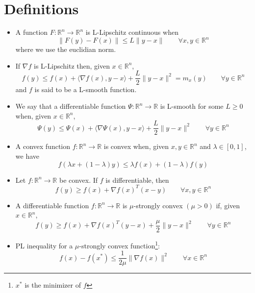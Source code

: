 \documentclass[12pt, openany]{report}
\begin{document}
\section{Definitions}
\begin{itemize}
    \item A function \(F:\mathbb{R}^n\rightarrow \mathbb{R}^n\) is L-Lipschitz continuous when \[\lVert F(y)-F(x)\rVert \le L\lVert y-x\rVert\qquad \forall x,y\in \mathbb{R}^n\]where we use the euclidian norm. 
    \item If \(\nabla f\) is L-Lipschitz then, given \(x\in \mathbb{R}^n\), \[f(y)\le f(x)+\langle \nabla f(x), y-x\rangle +\frac{L}{2}\lVert y-x\rVert^2 = m_x(y)\qquad \forall y\in \mathbb{R}^n\]and \(f\) is said to be a L-smooth function.
    \item We say that a differentiable function \(\Psi:\mathbb{R}^n\rightarrow \mathbb{R}\) is L-smooth for some \(L\ge 0\) when, given \(x\in \mathbb{R}^n\), \[\Psi(y) \le \Psi(x) + \langle \nabla \Psi (x),y-x\rangle + \frac{L}{2}\lVert y-x\rVert^2 \qquad \forall y\in \mathbb{R}^n\]
    \item A convex function \(f:\mathbb{R}^n \rightarrow \mathbb{R}\) is convex when, given \(x,y\in \mathbb{R}^n\) and \(\lambda \in [0,1]\), we have \[f(\lambda x+(1-\lambda)y)\le \lambda f(x)+(1-\lambda)f(y)\]
    \item Let \(f:\mathbb{R}^n\rightarrow\mathbb{R}\) be convex. If \(f\) is differentiable, then \[f(y) \ge f(x) + \nabla f(x)^T (x-y) \qquad \forall x,y\in \mathbb{R}^n\]
    \item A differentiable function \(f:\mathbb{R}^n\rightarrow \mathbb{R}\) is \(\mu\)-strongly convex \((\mu>0)\) if, given \(x\in \mathbb{R}^n\), \[f(y) \ge f(x) + \nabla f(x)^T(y-x) + \frac{\mu}{2}\lVert y-x\rVert^2 \qquad \forall y\in \mathbb{R}^n\]
    \item PL inequality for a \(\mu\)-strongly convex function\footnote{\(x^*\) is the minimizer of \(f\)}: \[f(x)-f(x^*)\le \frac{1}{2\mu} \lVert \nabla f(x)\rVert^2 \qquad \forall x\in \mathbb{R}^n\]
\end{itemize}
\end{document}
